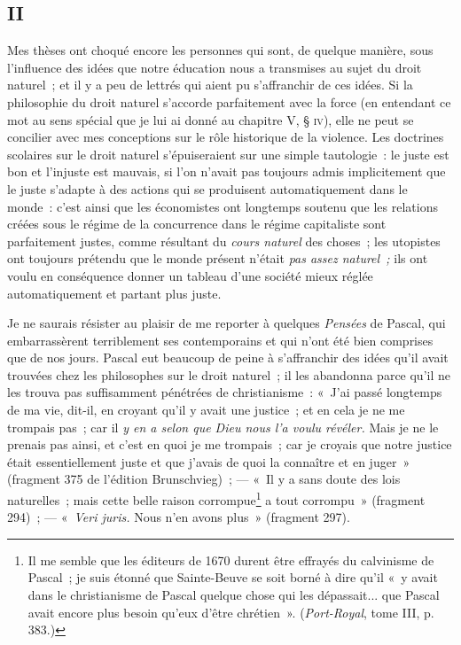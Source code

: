 \documentclass[french,twoside]{book} %
\begin{document}
\subsection[{II}]{II}
\noindent Mes thèses ont choqué encore les personnes qui sont, de quelque manière, sous l’influence des idées que notre éducation nous a transmises au sujet du droit naturel ; et il y a peu de lettrés qui aient pu s’affranchir de ces idées. Si la philosophie du droit naturel s’accorde parfaitement avec la force (en entendant ce mot au sens spécial que je lui ai donné au chapitre V, § {\scshape iv}), elle ne peut se concilier avec mes conceptions sur le rôle historique de la violence. Les doctrines scolaires sur le droit naturel s’épuiseraient sur une simple tautologie : le juste est bon et l’injuste est mauvais, si l’on n’avait pas toujours admis implicitement que le juste s’adapte à des actions qui se produisent automatiquement dans le monde : c’est ainsi  que les économistes ont longtemps soutenu que les relations créées sous le régime de la concurrence dans le régime capitaliste sont parfaitement justes, comme résultant du \emph{cours naturel} des choses ; les utopistes ont toujours prétendu que le monde présent n’était \emph{pas assez naturel ;} ils ont voulu en conséquence donner un tableau d’une société mieux réglée automatiquement et partant plus juste.\par
Je ne saurais résister au plaisir de me reporter à quelques \emph{Pensées} de Pascal, qui embarrassèrent terriblement ses contemporains et qui n’ont été bien comprises que de nos jours. Pascal eut beaucoup de peine à s’affranchir des idées qu’il avait trouvées chez les philosophes sur le droit naturel ; il les abandonna parce qu’il ne les trouva pas suffisamment pénétrées de christianisme : « J’ai passé longtemps de ma vie, dit-il, en croyant qu’il y avait une justice ; et en cela je ne me trompais pas ; car il \emph{y en a selon que Dieu nous l’a voulu révéler.} Mais je ne le prenais pas ainsi, et c’est en quoi je me trompais ; car je croyais que notre justice était essentiellement juste et que j’avais de quoi la connaître et en juger » (fragment 375 de l’édition Brunschvieg) ; — « Il y a sans doute des lois naturelles ; mais cette belle raison corrompue\footnote{ \noindent Il me semble que les éditeurs de 1670 durent être effrayés du calvinisme de Pascal ; je suis étonné que Sainte-Beuve se soit borné à dire qu’il « y avait dans le christianisme de Pascal quelque chose qui les dépassait... que Pascal avait encore plus besoin qu’eux d’être chrétien ». (\emph{Port-Royal}, tome III, p. 383.)
 } a tout corrompu » (fragment 294) ; —  « \emph{Veri juris.} Nous n’en avons plus » (fragment 297).\par
\end{document}
